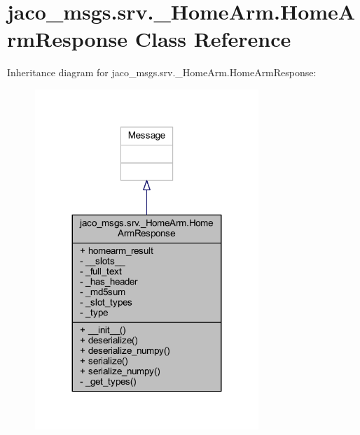 \hypertarget{classjaco__msgs_1_1srv_1_1__HomeArm_1_1HomeArmResponse}{}\section{jaco\+\_\+msgs.\+srv.\+\_\+\+Home\+Arm.\+Home\+Arm\+Response Class Reference}
\label{classjaco__msgs_1_1srv_1_1__HomeArm_1_1HomeArmResponse}


Inheritance diagram for jaco\+\_\+msgs.\+srv.\+\_\+\+Home\+Arm.\+Home\+Arm\+Response\+:
\nopagebreak
\begin{figure}[H]
\begin{center}
\leavevmode
\includegraphics[width=239pt]{d8/dbf/classjaco__msgs_1_1srv_1_1__HomeArm_1_1HomeArmResponse__inherit__graph}
\end{center}
\end{figure}



